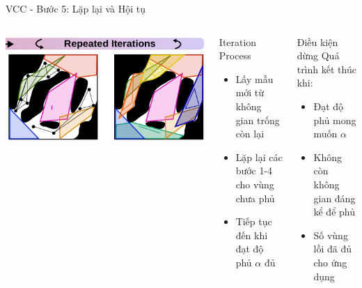 \documentclass[aspectratio=169]{beamer}
\begin{document}
\begin{frame}{VCC - Bước 5: Lặp lại và Hội tụ}
    \begin{columns}[c]
        \centering
        \includegraphics[width=\textwidth]{../imgs/VCC-5.png}

        \begin{block}{Iteration Process}
            \small
            \begin{itemize}
                \item Lấy mẫu mới từ không gian trống còn lại
                \item Lặp lại các bước 1-4 cho vùng chưa phủ
                \item Tiếp tục đến khi đạt độ phủ $\alpha$ đủ
            \end{itemize}
        \end{block}

        \begin{exampleblock}{Điều kiện dừng}
            \small
            Quá trình kết thúc khi:
            \begin{itemize}
                \item Đạt độ phủ mong muốn $\alpha$
                \item Không còn không gian đáng kể để phủ
                \item Số vùng lồi đã đủ cho ứng dụng
            \end{itemize}
        \end{exampleblock}
    \end{columns}
\end{frame}
\end{document}
